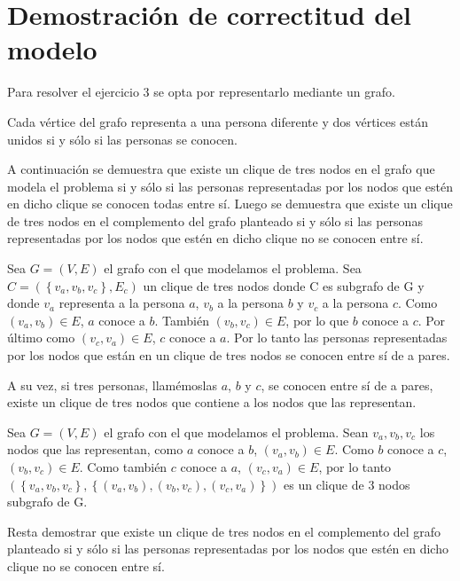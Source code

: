 \documentclass[a4paper, 12pt]{article}
\begin{document}
\section{Demostraci\'on de correctitud del modelo}\label{dem_clique}

Para resolver el ejercicio 3 se opta por representarlo mediante un grafo.

Cada v\'ertice del grafo representa a una persona diferente y dos v\'ertices est\'an unidos si y s\'olo si las personas se conocen.


A continuaci\'on se demuestra que existe un clique de tres nodos en el grafo que modela el problema si y s\'olo si las personas representadas por los nodos que est\'en en dicho clique se conocen todas entre s\'i. Luego se demuestra que existe un clique de tres nodos en el complemento del grafo planteado si y s\'olo si las personas representadas por los nodos que est\'en en dicho clique no se conocen entre s\'i.

Sea $G = \left( V, E \right)$ el grafo con el que modelamos el problema. Sea $ C = \left( \left\lbrace v_a, v_b,v_c \right\rbrace, E_c \right) $ un clique de tres nodos donde C es subgrafo de G y donde $v_a$ representa a la persona $a$, $v_b$ a la persona $b$ y $v_c$ a la persona $c$. Como $\left( v_a, v_b \right) \in E $, $a$ conoce a $b$. Tambi\'en $\left(v_b,v_c\right) \in E$, por lo que $b$ conoce a $c$. Por \'ultimo como $\left(v_c,v_a\right) \in E$, $c$ conoce a $a$. Por lo tanto las personas representadas por los nodos que est\'an en un clique de tres nodos se conocen entre s\'i de a pares.


A su vez, si tres personas, llam\'emoslas $a$, $b$ y $c$, se conocen entre s\'i de a pares, existe un clique de tres nodos que contiene a los nodos que las representan. 


Sea $ G = \left( V, E \right) $ el grafo con el que modelamos el problema. Sean $v_a, v_b, v_c$ los nodos que las representan, como $a$ conoce a $b$, $\left( v_a,v_b \right) \in E $. Como $b$ conoce a $c$, $ \left(v_b, v_c \right) \in E$. Como tambi\'en $c$ conoce a $a$, $ \left( v_c, v_a \right) \in E$, por lo tanto $\left( \left\lbrace v_a, v_b, v_c \right\rbrace, \left\lbrace  \left(v_a,v_b\right) , \left( v_b,v_c\right), \left( v_c, v_a\right) \right\rbrace\right)$ es un clique de 3 nodos subgrafo de G.


Resta demostrar que existe un clique de tres nodos en el complemento del grafo planteado si y s\'olo si las personas representadas por los nodos que est\'en en dicho clique no se conocen entre s\'i.
\end{document}
